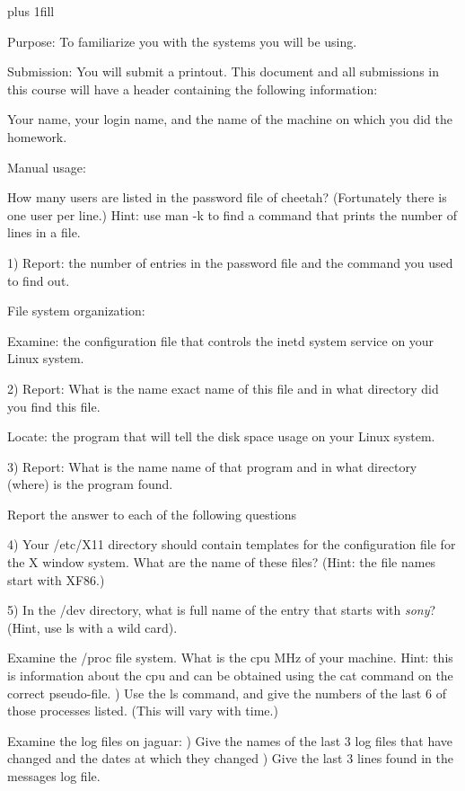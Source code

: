 
\rightskip=0pt plus 1fill

\parindent 0pt

Purpose:
To familiarize you with the systems you will be using.

Submission: You will submit a printout.
This document and all submissions in this course will have a header
containing the following information:

Your name, your login name, and the name of the machine on which you
did the homework.

Manual usage:

How many users are listed in the password file of cheetah?
(Fortunately there is one user per line.)
Hint: use {\ltt{}man -k} to find a command that prints the number
of lines in a file.

1) Report: the number of entries in the password file and
the command you used to find out.

File system organization:

Examine: the configuration file that controls the {\ltt{}inetd} system service
on your Linux system.

2) Report: What is the name exact name of this file
and in what directory did you find this file.

Locate: the program that will tell the disk space usage
on your Linux system.

3) Report: What is the name name of that program 
and in what directory (where) is the program found.

Report the answer to each of the following questions

4) Your {\ltt{}/etc/X11} directory should contain templates for
the configuration file for the {\ltt{}X} window system.
What are the name of these files?
(Hint: the file names start with XF86.)

5) In the {\ltt{}/dev} directory, what is full name of the entry that starts
with {\it sony}? (Hint, use ls with a wild card).

Examine the {\ltt{}/proc} file system.
What is the cpu MHz of your machine.
Hint: this is information about the cpu and can be obtained using the
cat command on the correct pseudo-file.
\hfill{}) Use the {\ltt{}ls} command, and give the numbers of the last 6
of those processes listed. (This will vary with time.)

Examine the log files on {\ltt{}jaguar}:
\hfill{}) Give the names of the last 3 log files that have changed and 
the dates at which they changed
\hfill{}) Give the last 3 lines found in the {\ltt{}messages} log file.


\bye
